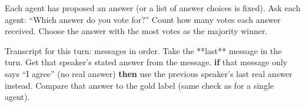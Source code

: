 \begin{algorithm}[H]
\caption{Voting}
\begin{algorithmic}[1]
\Require Each agent has proposed an answer (or a list of answer choices is fixed).
\State Ask each agent: ``Which answer do you vote for?''
\State Count how many votes each answer received.
\State Choose the answer with the most votes as the majority winner.
\end{algorithmic}
\end{algorithm}

\begin{algorithm}[H]
\caption{Consensus}
\begin{algorithmic}[1]
\Require Transcript for this turn: messages in order.
\State Take the **last** message in the turn.
\State Get that speaker's stated answer from the message.
\State \textbf{if} that message only says ``I agree'' (no real answer) \textbf{then} use the previous speaker's last real answer instead.
\State Compare that answer to the gold label (same check as for a single agent).
\end{algorithmic}
\end{algorithm}
